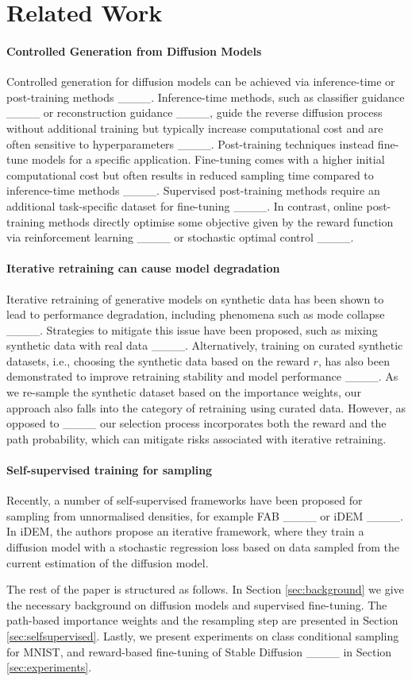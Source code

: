 \section{Related Work}
\paragraph{Controlled Generation from Diffusion Models}
Controlled generation for diffusion models can be achieved via inference-time or post-training methods ____. Inference-time methods, such as classifier guidance ____ or reconstruction guidance ____, guide the reverse diffusion process without additional training but typically increase computational cost and are often sensitive to hyperparameters ____. Post-training techniques instead fine-tune models for a specific application. Fine-tuning comes with a higher initial computational cost but often results in reduced sampling time compared to inference-time methods ____. Supervised post-training methods require an additional task-specific dataset for fine-tuning ____. In contrast, online post-training methods directly optimise some objective given by the reward function via reinforcement learning ____ or stochastic optimal control ____. 


\paragraph{Iterative retraining can cause model degradation} Iterative retraining of generative models on synthetic data has been shown to lead to performance degradation, including phenomena such as mode collapse ____. Strategies to mitigate this issue have been proposed, such as mixing synthetic data with real data ____. Alternatively, training on curated synthetic datasets, i.e., choosing the synthetic data based on the reward $r$, has also been demonstrated to improve retraining stability and model performance ____. As we re-sample the synthetic dataset based on the importance weights, our approach also falls into the category of retraining using curated data. However, as opposed to ____ our selection process incorporates both the reward and the path probability, which can mitigate risks associated with iterative retraining.
 
\paragraph{Self-supervised training for sampling} Recently, a number of self-supervised frameworks have been proposed for sampling from unnormalised densities, for example FAB ____ or iDEM ____. In iDEM, the authors propose an iterative framework, where they train a diffusion model with a stochastic regression loss based on data sampled from the current estimation of the diffusion model.  

The rest of the paper is structured as follows. In Section \ref{sec:background} we give the necessary background on diffusion models and supervised fine-tuning. The path-based importance weights and the resampling step are presented in Section \ref{sec:selfsupervised}. Lastly, we present experiments on class conditional sampling for MNIST, and reward-based fine-tuning of Stable Diffusion ____ in Section \ref{sec:experiments}.